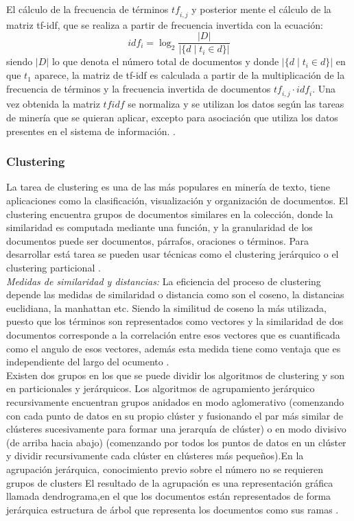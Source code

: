{El cálculo de la frecuencia de términos $\mathit{tf}_{i,j}$ y posterior mente el cálculo de la matriz tf-idf, que se realiza a partir de frecuencia invertida con la ecuación: 
$${idf}_i = \log_2 \frac{|D|}{|\{d \mid t_i \in d\}|}$$
siendo $|D|$ lo que denota el número total de documentos y donde $|\{d\mid t_i \in d\}|$ en  que $t_1$ aparece, la matriz de tf-idf es calculada a partir de la multiplicación de la frecuencia de términos y la frecuencia invertida de documentos $\mathit{tf}_{i,j} \cdot \mathit{idf}_i$. Una vez obtenida la matriz $tfidf$ se normaliza y se utilizan los datos según las tareas de minería que se quieran aplicar, excepto para asociación que utiliza los datos presentes en el sistema de información. \cite{Buckley1988,VishalGupta2009}.

\subsubsection{Clustering}

La tarea de clustering es una de las más populares en minería de texto, tiene aplicaciones como la clasificación, visualización y organización de documentos. El clustering encuentra grupos de documentos similares en la colección, donde la similaridad es computada mediante una función, y la granularidad de los documentos puede ser documentos, párrafos, oraciones o términos. Para desarrollar está tarea se pueden usar técnicas como el clustering jerárquico o el clustering particional \cite{Renganathan2017,Allahyari2017}.\\

\textit{Medidas de similaridad y distancias:} La eficiencia del proceso de clustering depende las medidas de similaridad o distancia como son el coseno, la distancias euclidiana, la manhattan etc. Siendo la similitud de coseno la más utilizada, puesto que los términos son representados como vectores y la similaridad de dos documentos corresponde a la correlación entre esos vectores que es cuantificada como el angulo de esos vectores, además esta medida tiene como ventaja que es independiente del largo del ocumento \cite{Renganathan2017,Huang2008}.\\

Existen dos grupos en los que se puede dividir los algoritmos de clustering y son en particionales y jerárquicos. Los algoritmos de agrupamiento jerárquico recursivamente encuentran grupos anidados en modo aglomerativo (comenzando con cada punto de datos en su propio clúster y fusionando el par más similar de clústeres sucesivamente para formar una jerarquía de clúster) o en modo divisivo (de arriba hacia abajo) (comenzando por todos los puntos de datos en un clúster y dividir recursivamente cada clúster en clústeres más pequeños).En la agrupación jerárquica, conocimiento previo sobre el número no se requieren grupos de clusters El resultado de la agrupación es una representación gráfica llamada dendrograma,en el que los documentos están representados de forma jerárquica estructura de árbol que representa los documentos como sus ramas \cite{Renganathan2017,Jain2010}.\\

}
